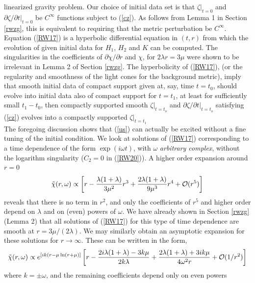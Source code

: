 \documentclass[12pt,aps,floats,showpacs,amssymb,tightenlines]{revtex4}
\newcommand{\p}{\partial}
\begin{document}
linearized gravity problem. Our choice of initial data set is that
$\zeta|_{t=0}$ and $\p \zeta / \p t |_{t=0}$ be $C^{\infty}$
functions subject to (\ref{cz}). As follows from Lemma 1 in Section
\ref{rwzg}, this is equivalent to requiring that the metric
perturbation be $C^{\infty}$. Equation  (\ref{RW17}) is a hyperbolic
differential equation in $(t,r)$ from which the evolution of given
initial data for $H_1$, $H_2$ and $K$ can be computed. The
singularities in the coefficients of $\partial \chi/\partial r$ and
$\chi$, for $2 \lambda r = 3 \mu$ were shown to be irrelevant in
Lemma 2 of Section \ref{rwzg}.
  The
hyperbolicity of (\ref{RW17}), (or the regularity and smoothness of
the light cones for the background metric), imply that smooth
initial data of compact support given at, say, time $t=t_0$, should
evolve into initial data also of compact support for $t=t_1$, at
least for sufficiently small $t_1-t_0$, then compactly supported
smooth $\zeta|_{t=t_o}$ and $\p \zeta / \p t |_{t=t_o}$ satisfying (\ref{cz})
evolves into a compactly supported $\zeta|_{t=t_1}$\\
The foregoing discussion shows that  (\ref{us}) can actually be
excited without a fine tuning of the initial condition. We look at
solutions of (\ref{RW17}) corresponding to a time dependence of the
form $\exp(i \omega t)$, with $\omega$ {\em arbitrary complex},
without the logarithm singularity ($C_2=0$ in (\ref{RW20})). A
higher order expansion around $r=0$
\begin{equation} \label{coso6} \tilde{\chi}(r,\omega) \propto \left[r
- \frac{\lambda(1+\lambda)}{3 \mu^2} r^3+
\frac{2\lambda(1+\lambda)}{9 \mu^3} r^4 + {\cal{O}}(r^5)\right]
\end{equation}
reveals  that there is no term in $r^2$, and only the coefficients
of $r^5$ and higher order depend on $\lambda$ and on (even) powers
of $\omega$. We have already shown in Section \ref{rwzg} (Lemma 2)
that all solutions of (\ref{RW17}) for this type of time dependence
are smooth at $r = 3 \mu /(2 \lambda)$. We may similarly obtain an
asymptotic expansion for these solutions for $r\rightarrow \infty$.
These can be written in the form,
\begin{equation} \label{coso7} \tilde{\chi}(r,\omega)  \propto  e^{[i k
(r-\mu \ln(r+\mu)]} \left[r - \frac{2 i \lambda(1+\lambda) -3 k
\mu}{2 k \lambda}   +\frac{2 \lambda(1+\lambda) + 3 i k \mu}{4
\omega^2 r} +{\cal{O}}(1/r^2)\right] \end{equation} where $k = \pm
\omega$, and the remaining coefficients depend only on even powers
\end{document}
